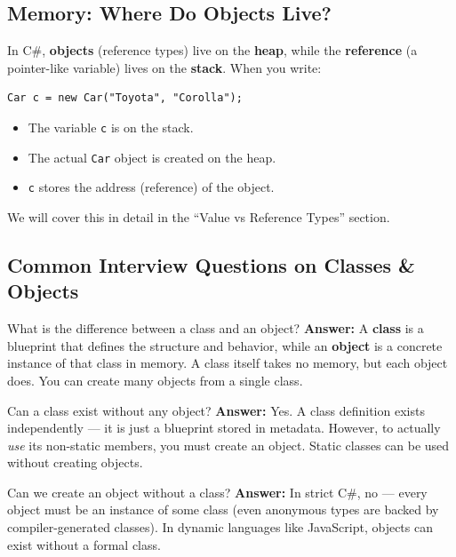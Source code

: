 \documentclass[11pt,a4paper]{article}
\begin{document}
\subsection{Memory: Where Do Objects Live?}

In C\#, \textbf{objects} (reference types) live on the \textbf{heap}, while the \textbf{reference} (a pointer-like variable) lives on the \textbf{stack}. When you write:

\begin{lstlisting}
Car c = new Car("Toyota", "Corolla");
\end{lstlisting}

\begin{itemize}[leftmargin=*]
    \item The variable \texttt{c} is on the stack.
    \item The actual \texttt{Car} object is created on the heap.
    \item \texttt{c} stores the address (reference) of the object.
\end{itemize}
We will cover this in detail in the ``Value vs Reference Types'' section.

\subsection{Common Interview Questions on Classes \& Objects}

\begin{intqBox}{What is the difference between a class and an object?}
\textbf{Answer:} A \textbf{class} is a blueprint that defines the structure and behavior, while an \textbf{object} is a concrete instance of that class in memory. A class itself takes no memory, but each object does. You can create many objects from a single class.
\end{intqBox}

\begin{intqBox}{Can a class exist without any object?}
\textbf{Answer:} Yes. A class definition exists independently — it is just a blueprint stored in metadata. However, to actually \textit{use} its non-static members, you must create an object. Static classes can be used without creating objects.
\end{intqBox}

\begin{intqBox}{Can we create an object without a class?}
\textbf{Answer:} In strict C\#, no — every object must be an instance of some class (even anonymous types are backed by compiler-generated classes). In dynamic languages like JavaScript, objects can exist without a formal class.
\end{intqBox}
\end{document}
